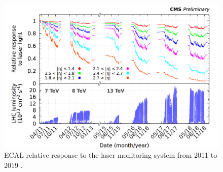 \begin{figure}[h!]
    \centering
    \includegraphics[width=0.85\linewidth]{fig//chap03-cms/rad_damage.png}
    \caption{ECAL relative response to the laser monitoring system from 2011 to 2019 \cite{EcalDPGResultsCMSDPS2019005TWiki}.}
    \label{fig:ecal_rad_damage}
\end{figure}

